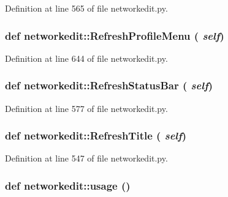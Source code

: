 Definition at line 565 of file networkedit.py.\hypertarget{namespacenetworkedit_16a1bfa553c27346c1afa95283839ff0}{
\subsubsection[RefreshProfileMenu]{\setlength{\rightskip}{0pt plus 5cm}def networkedit::Refresh\-Profile\-Menu ( {\em self})}}
\label{namespacenetworkedit_16a1bfa553c27346c1afa95283839ff0}




Definition at line 644 of file networkedit.py.\hypertarget{namespacenetworkedit_1fa2b2fd11d7a6dc830586a45eee2464}{
\subsubsection[RefreshStatusBar]{\setlength{\rightskip}{0pt plus 5cm}def networkedit::Refresh\-Status\-Bar ( {\em self})}}
\label{namespacenetworkedit_1fa2b2fd11d7a6dc830586a45eee2464}




Definition at line 577 of file networkedit.py.\hypertarget{namespacenetworkedit_84786509128cc13e6e1135aadac688ac}{
\subsubsection[RefreshTitle]{\setlength{\rightskip}{0pt plus 5cm}def networkedit::Refresh\-Title ( {\em self})}}
\label{namespacenetworkedit_84786509128cc13e6e1135aadac688ac}




Definition at line 547 of file networkedit.py.\hypertarget{namespacenetworkedit_d1c96437c6338056898af5f7119a2a7c}{
\subsubsection[usage]{\setlength{\rightskip}{0pt plus 5cm}def networkedit::usage ()}}
\label{namespacenetworkedit_d1c96437c6338056898af5f7119a2a7c}




